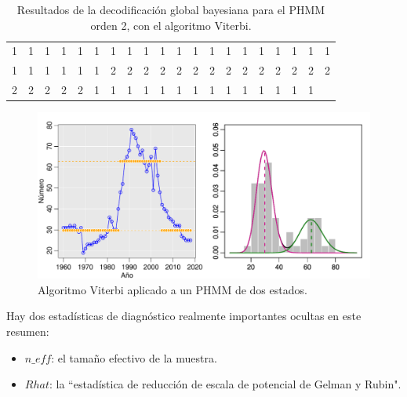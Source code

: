 \documentclass[a4paper]{article}\usepackage[]{graphicx}\usepackage[]{color}
\makeatletter
\def\maxwidth{ %
  \ifdim\Gin@nat@width>\linewidth
    \linewidth
  \else
    \Gin@nat@width
  \fi
}
\newenvironment{knitrout}{}{} %
\makeatother
\begin{document}
\begin{table}[ht]
\centering
\begin{tabular}{rrrrrrrrrrrrrrrrrrrr}
  \hline
  \hline
1 & 1 & 1 & 1 & 1 & 1 & 1 & 1 & 1 & 1 & 1 & 1 & 1 & 1 & 1 & 1 & 1 & 1 & 1 & 1 \\ 
  1 & 1 & 1 & 1 & 1 & 1 & 2 & 2 & 2 & 2 & 2 & 2 & 2 & 2 & 2 & 2 & 2 & 2 & 2 & 2 \\ 
  2 & 2 & 2 & 2 & 2 & 1 & 1 & 1 & 1 & 1 & 1 & 1 & 1 & 1 & 1 & 1 & 1 & 1 & 1 &  \\ 
   \hline
\end{tabular}
\caption{Resultados de la decodificación global bayesiana para el PHMM orden 2, con el algoritmo Viterbi.} 
\end{table}


\begin{knitrout}
\color{fgcolor}\begin{figure}
\includegraphics[width=\maxwidth]{figure/unnamed-chunk-28-1} \caption[Algoritmo Viterbi aplicado a un PHMM de dos estados]{Algoritmo Viterbi aplicado a un PHMM de dos estados.}\label{fig:unnamed-chunk-28}
\end{figure}


\end{knitrout}

Hay dos estadísticas de diagnóstico realmente importantes ocultas en este resumen:

\begin{itemize}
  \item $n\_eff$: el tamaño efectivo de la muestra.
  \item $Rhat$: la ``estadística de reducción de escala de potencial de Gelman y Rubin".
\end{itemize}
\end{document}
